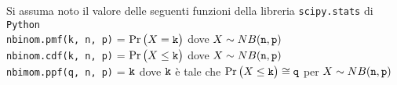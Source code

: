 \documentclass[11pt,twoside,a4paper]{article}
\begin{document}
Si assuma noto il valore delle seguenti funzioni della libreria {\tt scipy.stats\/} di  {\tt Python\/}\\
{\tt nbinom.pmf(k, n, p)} = $\Pr\big(X={\tt k}\big)$ dove $X\sim NB({\tt n},{\tt p})$\\
{\tt nbinom.cdf(k, n, p)} = $\Pr\big(X\le{\tt k}\big)$ dove  $X\sim NB({\tt n},{\tt p})$ \\
{\tt nbimom.ppf(q, n, p)} = ${\tt k}$ dove ${\tt k}$ è tale che $\Pr\big(X\le{\tt k}\big)\cong{\tt q}$ per $X\sim NB({\tt n},{\tt p})$ 
\end{document}

